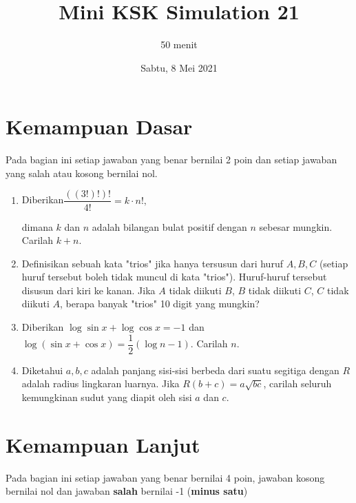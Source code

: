 \documentclass[12pt]{scrartcl}
\title{Mini KSK Simulation 21}
\author{50 menit}
\date{Sabtu, 8 Mei 2021}
\begin{document}
	\maketitle

\renewcommand*\contentsname{Daftar Isi}
\tableofcontents

\newpage
	
	\section{Kemampuan Dasar}
	Pada bagian ini setiap jawaban yang benar bernilai 2 poin dan setiap jawaban yang salah
	atau kosong bernilai nol.
	\begin{enumerate}
		\item Diberikan$ \dfrac{((3!)!)!}{4!} = k \cdot n!, $
		
		dimana $ k $ dan $ n $ adalah bilangan bulat positif dengan $ n $ sebesar mungkin. Carilah $ k + n. $
		
		\item Definisikan sebuah kata "trios" jika hanya tersusun dari huruf $A,B,C$ (setiap huruf tersebut boleh tidak muncul di kata "trios"). Huruf-huruf tersebut disusun dari kiri ke kanan. Jika $A$ tidak diikuti $B$, $B$ tidak diikuti $C$, $C$ tidak diikuti $A$, berapa banyak "trios" 10 digit yang mungkin?
		
		\item Diberikan $\log \sin x + \log \cos x = -1$ dan $\log (\sin x+\cos x) = \dfrac{1}{2}(\log n - 1)$. Carilah $n$.
		
		
		
		\item Diketahui $a,b,c$ adalah panjang sisi-sisi berbeda dari suatu segitiga dengan $R$ adalah radius lingkaran luarnya. Jika $R(b+c)=a\sqrt{bc}$, carilah seluruh kemungkinan sudut yang diapit oleh sisi $a$ dan $c$.
		
	\end{enumerate}

\section{Kemampuan Lanjut}
Pada bagian ini setiap jawaban yang benar bernilai 4 poin, jawaban kosong bernilai nol
dan jawaban \textbf{salah} bernilai -1 (\textbf{minus satu})
\end{document}
